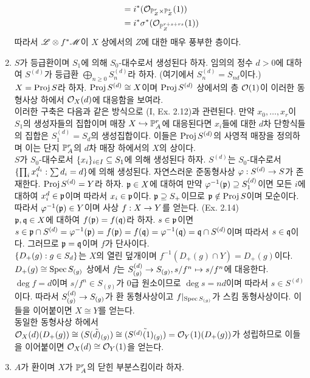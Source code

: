 \begin{enumerate}[label=\tb{5.\arabic*.},itemindent=0mm,itemsep=4mm]
\begin{align*}
	&=i^*(\mathcal{O}_{\mathbb{P}_Z^r\times\mathbb{P}_Z^s}(1))\\
	&=i^*\sigma^*(\mathcal{O}_{\mathbb{P}_Z^{r+s+rs}}(1))
	\end{align*}
	따라서 $\mathscr{L}\otimes f^*\mathscr{M}$이 $X$ 상에서의 $Z$에 대한 매우 풍부한 층이다.
	\item $S$가 등급환이며 $S_1$에 의해 $S_0$-대수로서 생성된다 하자.
	임의의 정수 $d>0$에 대하여 $S^{(d)}$가 등급환 $\bigoplus_{n\ge 0}S_n^{(d)}$라 하자. (여기에서 $S_n^{(d)}=S_{nd}$이다.)
	$X=\operatorname{Proj} S$라 하자. $\operatorname{Proj} S^{(d)}\cong X$이며
	$\operatorname{Proj} S^{(d)}$ 상에서의 층 $\mathcal{O}(1)$이 이러한 동형사상 하에서 $\mathcal{O}_X(d)$에 대응함을 보여라.\\
	이러한 구축은 다음과 같은 방식으로 (I, Ex. 2.12)과 관련된다.
	만약 $x_0,\ldots,x_r$이 $S_1$의 생성자들의 집합이며 매장 $X\hookrightarrow\mathbb{P}^r_A$에 대응된다면
	$x_i$들에 대한 $d$차 단항식들의 집합은 $S_1^{(d)}=S_d$의 생성집합이다.
	이들은 $\operatorname{Proj} S^{(d)}$의 사영적 매장을 정의하며 이는 단지 $\mathbb{P}^r_A$의 $d$차 매장 하에서의 $X$의 상이다.\\
	\sol $S$가 $S_0$-대수로서 $\{x_i\}_{i\in I}\subseteq S_1$에 의해 생성된다 하자.
	$S^{(d)}$는 $S_0$-대수로서 $\{\prod_ix_i^{d_i}:\sum d_i=d\}$에 의해 생성된다.
	자연스러운 준동형사상 $\varphi:S^{(d)}\rightarrow S$가 존재한다. $\operatorname{Proj} S^{(d)}=Y$라 하자.
	$\mathfrak{p}\in X$에 대하여 만약 $\varphi^{-1}(\mathfrak{p})\supseteq S^{(d)}_1$이면
	모든 $i$에 대하여 $x_i^d\in\mathfrak{p}$이며 따라서 $x_i\in\mathfrak{p}$이다.
	$\mathfrak{p}\supseteq S_+$이므로 $\mathfrak{p}\notin\operatorname{Proj} S$이며 모순이다.
	따라서 $\varphi^{-1}(\mathfrak{p})\in Y$이며 사상 $f:X\rightarrow Y$를 얻는다. (Ex. 2.14)\\
	$\mathfrak{p},\mathfrak{q}\in X$에 대하여 $f(\mathfrak{p})=f(\mathfrak{q})$라 하자.
	$s\in\mathfrak{p}$이면 $s\in\mathfrak{p}\cap S^{(d)}=\varphi^{-1}(\mathfrak{p})=f(\mathfrak{p})=f(\mathfrak{q})=\varphi^{-1}(\mathfrak{q})=\mathfrak{q}\cap S^{(d)}$이며
	따라서 $s\in\mathfrak{q}$이다. 그러므로 $\mathfrak{p}=\mathfrak{q}$이며 $f$가 단사이다.\\
	$\{D_+(g):g\in S_d\}$는 $X$의 열린 덮개이며 $f^{-1}(D_+(g)\cap Y)=D_+(g)$이다.
	$D_+(g)\cong\operatorname{Spec} S_{(g)}$ 상에서 $f$는 $S^{(d)}_{(g)}\rightarrow S_{(g)},s/f^n\mapsto s/f^n$에 대응한다.
	$\deg f=d$이며 $s/f^n\in S_{(g)}$가 0급 원소이므로 $\deg s=nd$이며 따라서 $s\in S^{(d)}$이다.
	따라서 $S^{(d)}_{(g)}\rightarrow S_{(g)}$가 환 동형사상이고 $f|_{\operatorname{Spec} S_{(g)}}$가 스킴 동형사상이다.
	이들을 이어붙이면 $X\cong Y$를 얻는다.\\
	동일한 동형사상 하에서 $\mathcal{O}_X(d)(D_+(g))\cong\tilde{(S(d)_{(g)})}
	\cong\tilde{(S^{(d)}(1)_{(g)})}=\mathcal{O}_Y(1)(D_+(g))$가 성립하므로 이들을 이어붙이면 $\mathcal{O}_X(d)\cong\mathcal{O}_Y(1)$을 얻는다.
	\item $A$가 환이며 $X$가 $\mathbb{P}^r_A$의 닫힌 부분스킴이라 하자.

\end{enumerate}
